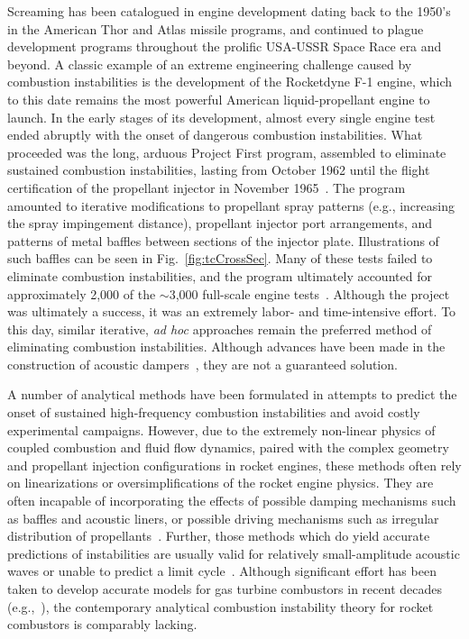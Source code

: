 Screaming has been catalogued in engine development dating back to the 1950's in the American Thor and Atlas missile programs, and continued to plague development programs throughout the prolific USA-USSR Space Race era and beyond. A classic example of an extreme engineering challenge caused by combustion instabilities is the development of the Rocketdyne F-1 engine, which to this date remains the most powerful American liquid-propellant engine to launch. In the early stages of its development, almost every single engine test ended abruptly with the onset of dangerous combustion instabilities. What proceeded was the long, arduous Project First program, assembled to eliminate sustained combustion instabilities, lasting from October 1962 until the flight certification of the propellant injector in November 1965~\cite{Young2008}. The program amounted to iterative modifications to propellant spray patterns (e.g., increasing the spray impingement distance), propellant injector port arrangements, and patterns of metal baffles between sections of the injector plate. Illustrations of such baffles can be seen in Fig.~\ref{fig:tcCrossSec}. Many of these tests failed to eliminate combustion instabilities, and the program ultimately accounted for approximately 2,000 of the $\sim$3,000 full-scale engine tests~\cite{Oefelein1993}. Although the project was ultimately a success, it was an extremely labor- and time-intensive effort. To this day, similar iterative, \textit{ad hoc} approaches remain the preferred method of eliminating combustion instabilities. Although advances have been made in the construction of acoustic dampers~\cite{Zhao2015}, they are not a guaranteed solution.

A number of analytical methods have been formulated in attempts to predict the onset of sustained high-frequency combustion instabilities and avoid costly experimental campaigns. However, due to the extremely non-linear physics of coupled combustion and fluid flow dynamics, paired with the complex geometry and propellant injection configurations in rocket engines, these methods often rely on linearizations or oversimplifications of the rocket engine physics. They are often incapable of incorporating the effects of possible damping mechanisms such as baffles and acoustic liners, or possible driving mechanisms such as irregular distribution of propellants~\cite{Yang1995}. Further, those methods which do yield accurate predictions of instabilities are usually valid for relatively small-amplitude acoustic waves or unable to predict a limit cycle~\cite{Culick1994}. Although significant effort has been taken to develop accurate models for gas turbine combustors in recent decades (e.g.,~\cite{Noiray2008}), the contemporary analytical combustion instability theory for rocket combustors is comparably lacking.

